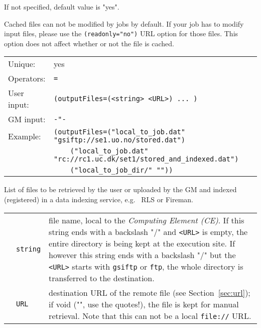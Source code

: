   If not specified, default value is "yes".

  \begin{framed} 
  Cached files can not be modified by jobs by default. If your job has
  to modify input files, please use the \texttt{(readonly="no")} URL
  option for those files. This option does not affect whether or not
  the file is cached.
  \end{framed}

  \hspace*{0.5cm}
  \begin{shaded}
  \end{shaded}
  \begin{tabular}{lp{13cm}}
    Unique:&yes\\
    Operators:&\verb#=#\\
    User input:&\verb#(outputFiles=(<string> <URL>) ... )#\\
    GM input:&\verb#-"-#\\
    Example:&\verb#(outputFiles=("local_to_job.dat" "gsiftp://se1.uo.no/stored.dat")#\\
    &\verb#    ("local_to_job.dat" "rc://rc1.uc.dk/set1/stored_and_indexed.dat")#\\  
    &\verb#    ("local_to_job_dir/" ""))#\\  
  \end{tabular}

  List of files to be retrieved by the user or uploaded by the GM and
  indexed (registered) in a data indexing service, e.g. \globus\  RLS or Fireman.

  \begin{tabular}{llp{10cm}}
    \hspace*{1cm}&\texttt{string}& file name, local to the
    \textit{Computing Element (CE)}\index{Computing Element}. If this
    string ends with a backslash "/" and \verb#<URL># is empty, the
    entire directory is being kept at the execution site. If however
    this string ends with a backslash "/" but the \verb#<URL>#
    starts with \texttt{gsiftp} or \texttt{ftp}, the whole directory
    is transferred to the destination.\\
    \hspace*{1cm}&\texttt{URL} & destination URL of the remote file (see
    Section~\ref{sec:url}); if void ("", use the quotes!), the file is
    kept for manual retrieval.  Note that this can not be a local
    \texttt{file://} URL.\\
  \end{tabular}

